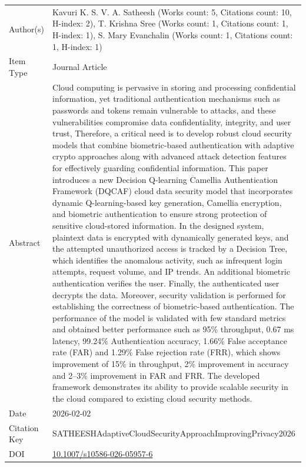 \documentclass{article}
\begin{document}
\begin{enumerate}[label=\arabic*., font=\Large]
\begin{longtable}{p{} p{\contentcolwidth-2\tabcolsep}}
\toprule
Author(s) & Kavuri K. S. V. A. Satheesh (Works count: 5, Citations count: 10, H-index: 2), T. Krishna Sree (Works count: 1, Citations count: 1, H-index: 1), S. Mary Evanchalin (Works count: 1, Citations count: 1, H-index: 1) \\
Item Type & Journal Article \\
Abstract & Cloud computing is pervasive in storing and processing confidential information, yet traditional authentication mechanisms such as passwords and tokens remain vulnerable to attacks, and these vulnerabilities compromise data confidentiality, integrity, and user trust, Therefore, a critical need is to develop robust cloud security models that combine biometric-based authentication with adaptive crypto approaches along with advanced attack detection features for effectively guarding confidential information. This paper introduces a new Decision Q-learning Camellia Authentication Framework (DQCAF) cloud data security model that incorporates dynamic Q-learning-based key generation, Camellia encryption, and biometric authentication to ensure strong protection of sensitive cloud-stored information. In the designed system, plaintext data is encrypted with dynamically generated keys, and the attempted unauthorized access is tracked by a Decision Tree, which identifies the anomalous activity, such as infrequent login attempts, request volume, and IP trends. An additional biometric authentication verifies the user. Finally, the authenticated user decrypts the data. Moreover, security validation is performed for establishing the correctness of biometric-based authentication. The performance of the model is validated with few standard metrics and obtained better performance such as 95\% throughput, 0.67 ms latency, 99.24\% Authentication accuracy, 1.66\% False acceptance rate (FAR) and 1.29\% False rejection rate (FRR), which shows improvement of 15\% in throughput, 2\% improvement in accuracy and 2--3\% improvement in FAR and FRR. The developed framework demonstrates its ability to provide scalable security in the cloud compared to existing cloud security methods. \\
Date & 2026-02-02 \\
Citation Key & SATHEESHAdaptiveCloudSecurityApproachImprovingPrivacy2026 \\
DOI & \href{http://doi.org/10.1007/s10586-026-05957-6}{10.1007/s10586-026-05957-6} \\

\end{longtable}
\end{enumerate}
\end{document}
